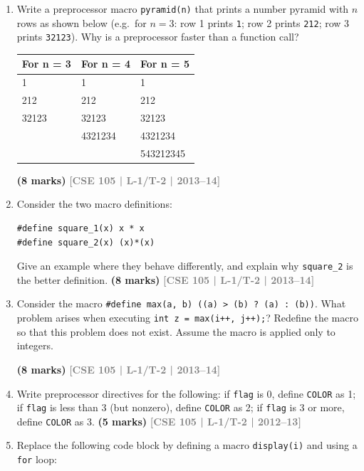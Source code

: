 \documentclass[12pt,a3paper]{article}
\newcommand{\yr}[1]{\hfill\textcolor{gray}{\small\textbf{[#1]}}}
\newcommand{\mk}[1]{\textcolor{orange!70!black}{\small\textbf{(#1 marks)}}}
\begin{document}
\begin{enumerate}
\item Write a preprocessor macro \texttt{pyramid(n)} that prints a number pyramid with $n$ rows as shown below (e.g.\ for $n=3$: row 1 prints \texttt{1}; row 2 prints \texttt{212}; row 3 prints \texttt{32123}). Why is a preprocessor faster than a function call?
\begin{center}
  \begin{tabular}{|C{2cm}|C{2cm}|C{2.5cm}|}
\hline
\textbf{For n = 3} & \textbf{For n = 4} & \textbf{For n = 5} \\       & 1        & 1          \\ 
212    & 212      & 212        \\ 
32123  & 32123    & 32123      \\ 
       & 4321234  & 4321234    \\ 
       &          & 543212345  \\ \hline
\end{tabular}
\end{center}

\mk{8} \yr{CSE 105 | L-1/T-2 | 2013--14}

\item Consider the two macro definitions:
 
\begin{lstlisting}
#define square_1(x) x * x
#define square_2(x) (x)*(x)
\end{lstlisting}
Give an example where they behave differently, and explain why \texttt{square\_2} is the better definition.
\mk{8} \yr{CSE 105 | L-1/T-2 | 2013--14}

\item Consider the macro \texttt{\#define max(a, b) ((a) > (b) ? (a) : (b))}. What problem arises when executing \texttt{int z = max(i++, j++);}? Redefine the macro so that this problem does not exist. Assume the macro is applied only to integers.
 
\mk{8} \yr{CSE 105 | L-1/T-2 | 2013--14}

\item Write preprocessor directives for the following: if \texttt{flag} is 0, define \texttt{COLOR} as 1; if \texttt{flag} is less than 3 (but nonzero), define \texttt{COLOR} as 2; if \texttt{flag} is 3 or more, define \texttt{COLOR} as 3.
\mk{5} \yr{CSE 105 | L-1/T-2 | 2012--13}

\item Replace the following code block by defining a macro \texttt{display(i)} and using a \texttt{for} loop:
 

\end{enumerate}
\end{document}

